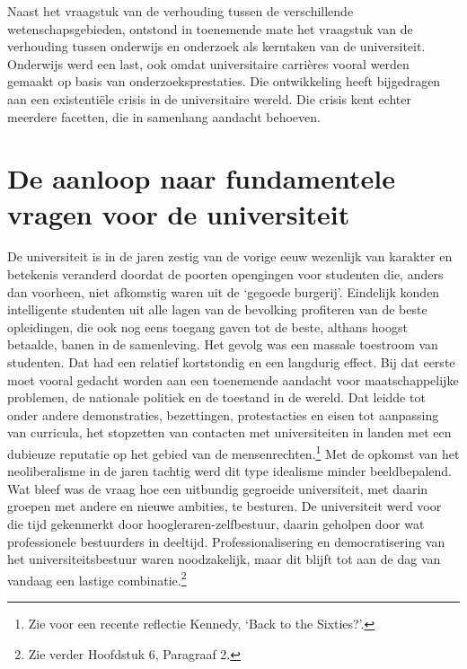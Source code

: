 \documentclass[smallauthor, chapterhaspagenum, nochapterinheader, pagenuminheader,  bigchapnum,medium2, tocpages, garamond, titleinheader]{jote-book}
\begin{document}
	Naast het vraagstuk van de verhouding tussen de verschillende wetenschapsgebieden, ontstond in toenemende mate het vraagstuk van de verhouding tussen onderwijs en onderzoek als kerntaken van de universiteit. Onderwijs werd een last, ook omdat universitaire carrières vooral werden gemaakt op basis van onderzoeksprestaties. Die ontwikkeling heeft bijgedragen aan een existentiële crisis in de universitaire wereld. Die crisis kent echter meerdere facetten, die in samenhang aandacht behoeven.



	\section{De aanloop naar fundamentele vragen voor de universiteit}



	De universiteit is in de jaren zestig van de vorige eeuw wezenlijk van karakter en betekenis veranderd doordat de poorten opengingen voor studenten die, anders dan voorheen, niet afkomstig waren uit de ‘gegoede burgerij'. Eindelijk konden intelligente studenten uit alle lagen van de bevolking profiteren van de beste opleidingen, die ook nog eens toegang gaven tot de beste, althans hoogst betaalde, banen in de samenleving. Het gevolg was een massale toestroom van studenten. Dat had een relatief kortstondig en een langdurig effect. Bij dat eerste moet vooral gedacht worden aan een toenemende aandacht voor maatschappelijke problemen, de nationale politiek en de toestand in de wereld. Dat leidde tot onder andere demonstraties, bezettingen, protestacties en eisen tot aanpassing van curricula, het stopzetten van contacten met universiteiten in landen met een dubieuze reputatie op het gebied van de mensenrechten.\footnote{Zie voor een recente reflectie Kennedy, ‘Back to the Sixties?'. } Met de opkomst van het neoliberalisme in de jaren tachtig werd dit type idealisme minder beeldbepalend. Wat bleef was de vraag hoe een uitbundig gegroeide universiteit, met daarin groepen met andere en nieuwe ambities, te besturen. De universiteit werd voor die tijd gekenmerkt door hoogleraren-zelfbestuur, daarin geholpen door wat professionele bestuurders in deeltijd. Professionalisering en democratisering van het universiteitsbestuur waren noodzakelijk, maar dit blijft tot aan de dag van vandaag een lastige combinatie.\footnote{Zie verder Hoofdstuk 6, Paragraaf 2.}
\end{document}
